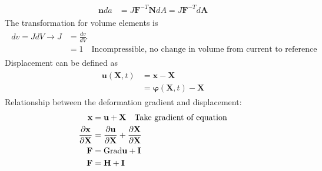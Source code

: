 \documentclass[12pt,3p]{article}
\numberwithin{equation}{section}
\begin{document}
\begin{align}\label{311}
\begin{split}
\mathbf{n} da &= J \mathbf{F}^{-T} \mathbf{N} dA = J \mathbf{F}^{-T} d\mathbf{A} 
\end{split}
\end{align}
The transformation for volume elements is
\begin{align}\label{312}
\begin{split}
dv = J dV \rightarrow J &= \frac{dv}{dV} \\
							    &= 1 \quad \text{Incompressible, no change in volume from current to reference }
\end{split}
\end{align}
Displacement can be defined as
\begin{align}\label{313}
\begin{split}
\mathbf{u} (\mathbf{X},t) &= \mathbf{x} - \mathbf{X} \\
	&= \pmb{\varphi} (\mathbf{X},t) - \mathbf{X}
\end{split}
\end{align}
Relationship between the deformation gradient and displacement:
\begin{align}\label{314}
\begin{split}
\mathbf{x} &= \mathbf{u} + \mathbf{X}  \quad \text{Take gradient of equation} \\
\pdv{\mathbf{x}}{\mathbf{X}} &= \pdv{\mathbf{u}}{\mathbf{X}} + \pdv{\mathbf{X}}{\mathbf{X}} \\
\mathbf{F} &= \text{Grad} \mathbf{u} + \mathbf{I} \\
\mathbf{F} &= \mathbf{H} + \mathbf{I}
\end{split}
\end{align}
\end{document}
